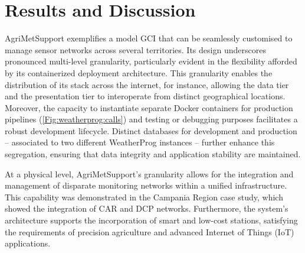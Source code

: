 \documentclass[authoryear,preprint,review,12pt]{elsarticle}
\begin{document}



\section{Results and Discussion}
AgriMetSupport exemplifies a model GCI that can be seamlessly customised to manage sensor networks across several territories.
Its design underscores pronounced multi-level granularity,
particularly evident in the flexibility afforded by its containerized deployment architecture. 
This granularity enables the distribution of its stack across the internet, for instance, allowing the data tier and the presentation tier to interoperate from distinct geographical locations. 
Moreover, the capacity to instantiate separate Docker containers for production pipelines (\cref{Fig:weatherprog:calls}) and testing or debugging purposes facilitates a robust development lifecycle.
Distinct databases for development and production -- associated to two different WeatherProg instances -- further enhance this segregation, ensuring that data integrity and application stability are maintained.

At a physical level, AgriMetSupport's granularity allows for the integration and management of disparate monitoring networks within a unified infrastructure.
This capability was demonstrated in the Campania Region case study, which showed the integration of CAR and DCP networks.
Furthermore, the system's architecture supports the incorporation of smart and low-cost stations, satisfying the requirements of precision agriculture and advanced Internet of Things (IoT) applications. %
\end{document}
